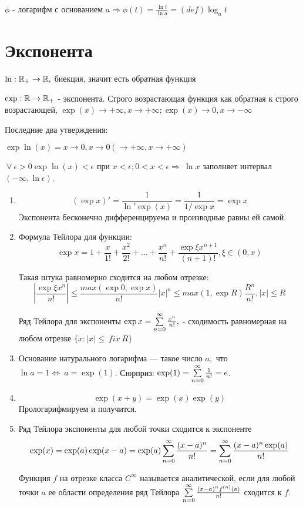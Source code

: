 \documentclass[12pt]{report}
\begin{document}
\begin{cor}
$\phi$ - логарифм с основанием $a \Rightarrow \phi(t) = \frac{\ln{t}}{\ln{a}} = (def) \log_a{t}$
\end{cor}

\section{Экспонента}

\begin{defn}
$\ln: \mathbb{R}_{+} \to \mathbb{R},$ биекция, значит есть обратная функция

$\exp: \mathbb{R} \to \mathbb{R}_{+}$ - экспонента. Строго возрастающая функция как обратная к строго возрастающей, $\exp(x) \to +\infty, x \to +\infty; \exp(x) \to 0, x \to -\infty$

Последние два утверждения:

$\exp{\ln(x)} = x \to 0, x \to 0 (\to +\infty, x \to +\infty)$

$~\forall ~\epsilon > 0 \exp{\ln(x)} < \epsilon$ при $x < \epsilon; 0 < x < \epsilon \Rightarrow ~\ln{x}$ заполняет интервал $(-\infty, \ln{\epsilon})$.
\end{defn}

\begin{st}
\begin{enumerate}
\item
$$(\exp{x})' = \frac{1}{\ln'{\exp(x)}} = \frac{1}{1/\exp{x}} = \exp{x}$$
Экспонента бесконечно дифференцируема и производные равны ей самой.

\item Формула Тейлора для функции:
$$\exp{x} = 1 + \frac{x}{1!} + \frac{x^2}{2!} + \dots + \frac{x^n}{n!} + \frac{\exp{\xi}x^{n + 1}}{(n + 1)!}, \xi \in (0, x)$$

Такая штука равномерно сходится на любом отрезке:
$$\left|\frac{\exp{\xi}x^{n}}{n!}\right| \le \frac{max(\exp{0}, \exp{x})}{n!}|x|^n \le max(1, \exp{R})\frac{R^n}{n!}, |x| \le R$$

Ряд Тейлора для экспоненты $\exp{x} = \sum\limits_{n = 0}^\infty{\frac{x^n}{n!}},$ - сходимость равномерная на любом отрезке $\{x: |x| \le ~fix ~R\}$

\item Основание натурального логарифма --- такое число $a,$ что $\ln{a} = 1 \Leftrightarrow ~a = \exp(1)$. Сюрприз: $\exp(1) = \sum\limits_{n = 0}^\infty{\frac{1}{n!}} = e$.

\item 
$$\exp(x + y) = \exp(x)\exp(y)$$
Прологарифмируем и получится.

\item Ряд Тейлора экспоненты для любой точки сходится к экспоненте
$$\exp(x) = \exp(a)\exp(x - a) = \exp(a)\sum\limits_{n = 0}^\infty{\frac{(x - a)^n}{n!}} = \sum\limits_{n = 0}^\infty{\frac{(x - a)^n\exp(a)}{n!}}$$

\begin{defn}
Функция $f$ на отрезке класса $C^\infty$ называется аналитической, если для любой точки $a$ ее области определения ряд Тейлора $\sum\limits_{n = 0}^\infty{\frac{(x - a)^n f^{(n)}(a)}{n!}}$ сходится к $f$.
\end{defn}
\end{enumerate}
\end{st}
\end{document}
